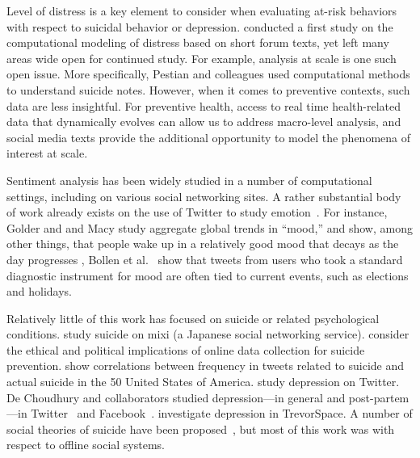 \documentclass[11pt]{article}
\begin{document}
Level of distress is a key element to consider when evaluating at-risk behaviors with respect to suicidal behavior or depression.  conducted a first study on the computational modeling of distress based on short forum texts, yet left many areas wide open for continued study. For example, analysis at scale is one such open issue. More specifically, Pestian and colleagues \cite{pestinaetal2009,pestinaetal2008} used computational methods to understand suicide notes. However, when it comes to preventive contexts, such data are less insightful. For preventive health, access to real time health-related data that dynamically evolves can allow us to address macro-level analysis, and social media texts provide the additional opportunity to model the phenomena of interest at scale.

Sentiment analysis has been widely studied in a number of computational settings, including on various social networking sites. 
A rather substantial body of work already exists on the use of Twitter to study emotion~\cite{bollen2011twitter,dodds2011temporal,wang2012harnessing,pfitzner2012emotional,kim2012you,bollen2011happiness,pfitzner2012emotional,bollen2011modeling,mohammad2012emotional,golder2011diurnal,de2012not,de2012happy,de2013major,de2013understanding,hannak2012tweetin,thelwall2011sentiment,pak2010twitter}. For instance,
Golder and and Macy study aggregate global trends in ``mood,'' and show, among other things, that people wake up in a relatively good mood that decays as the day progresses \cite{golder2011diurnal}, Bollen et al.~\cite{bollen2011modeling} show that tweets from users who took a standard diagnostic instrument for mood are often tied to current events, such as elections and holidays.

Relatively little of this work has focused on suicide or related psychological conditions.  study suicide on mixi (a Japanese social networking service).  consider the ethical and political implications of online data collection for suicide prevention.  show correlations between frequency in tweets related to suicide and actual suicide in the 50 United States of America.  study depression on Twitter. De Choudhury and collaborators studied depression---in general and post-partem---in Twitter~\cite{de2012not,de2012happy,de2013major,de2013understanding} and Facebook~\cite{de2014characterizing}.  investigate depression in TrevorSpace. A number of social theories of suicide have been proposed~\cite{wray2011sociology}, but most of this work was with respect to offline social systems. 
\end{document}
